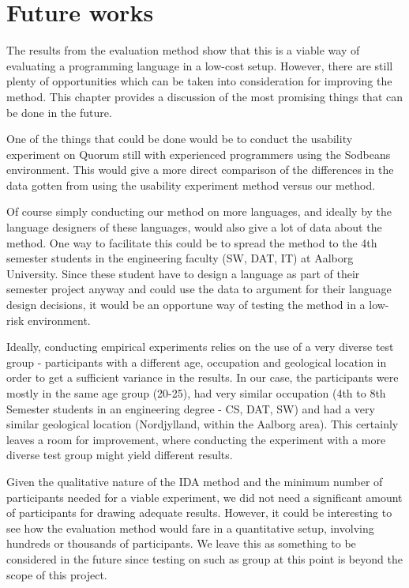 \chapter{Future works}
\label{chap:further_works}
The results from the evaluation method show that this is a viable way of evaluating a programming language in a low-cost setup. However, there are still plenty of opportunities which can be taken into consideration for improving the method. This chapter provides a discussion of the most promising things that can be done in the future.

One of the things that could be done would be to conduct the usability experiment on Quorum still with experienced programmers using the Sodbeans environment.
This would give a more direct comparison of the differences in the data gotten from using the usability experiment method versus our method.

Of course simply conducting our method on more languages, and ideally by the language designers of these languages, would also give a lot of data about the method.
One way to facilitate this could be to spread the method to the 4th semester students in the engineering faculty (SW, DAT, IT) at Aalborg University.
Since these student have to design a language as part of their semester project anyway and could use the data to argument for their language design decisions, it would be an opportune way of testing the method in a low-risk environment.

Ideally, conducting empirical experiments relies on the use of a very diverse test group - participants with a different age, occupation and geological location in order to get a sufficient variance in the results. In our case, the participants were mostly in the same age group (20-25), had very similar occupation (4th to 8th Semester students in an engineering degree - CS, DAT, SW) and had a very similar geological location (Nordjylland, within the Aalborg area). This certainly leaves a room for improvement, where conducting the experiment with a more diverse test group might yield different results.

Given the qualitative nature of the IDA method and the minimum number of participants needed for a viable experiment, we did not need a significant amount of participants for drawing adequate results. However, it could be interesting to see how the evaluation method would fare in a quantitative setup, involving hundreds or thousands of participants. We leave this as something to be considered in the future since testing on such as group at this point is beyond the scope of this project.

